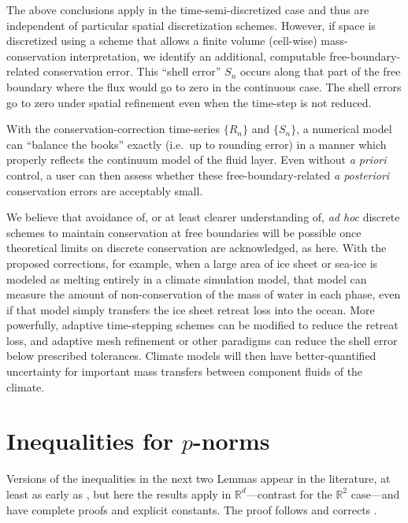 \documentclass[final,leqno,onefignum,onetabnum]{siamltex1213bueler}
\newcommand\RR{\mathbb{R}}
\begin{document}
The above conclusions apply in the time-semi-discretized case and thus are independent of particular spatial discretization schemes.  However, if space is discretized using a scheme that allows a finite volume (cell-wise) mass-conservation interpretation, we identify an additional, computable free-boundary-related conservation error.  This ``shell error'' $S_n$ occurs along that part of the free boundary where the flux would go to zero in the continuous case.  The shell errors go to zero under spatial refinement even when the time-step is not reduced.

With the conservation-correction time-series $\{R_n\}$ and $\{S_n\}$, a numerical model can ``balance the books'' exactly (i.e.~up to rounding error) in a manner which properly reflects the continuum model of the fluid layer.  Even without \emph{a priori} control, a user can then assess whether these free-boundary-related \emph{a posteriori} conservation errors are acceptably small.

We believe that avoidance of, or at least clearer understanding of, \emph{ad hoc} discrete schemes to maintain conservation at free boundaries will be possible once theoretical limits on discrete conservation are acknowledged, as here.  With the proposed corrections, for example, when a large area of ice sheet or sea-ice is modeled as melting entirely in a climate simulation model, that model can measure the amount of non-conservation of the mass of water in each phase, even if that model simply transfers the ice sheet retreat loss into the ocean.  More powerfully, adaptive time-stepping schemes can be modified to reduce the retreat loss, and adaptive mesh refinement or other paradigms can reduce the shell error below prescribed tolerances.  Climate models will then have better-quantified uncertainty for important mass transfers between component fluids of the climate.







\appendix

\section{Inequalities for $p$-norms}   \label{app:pinequalities}  Versions of the inequalities in the next two Lemmas appear in the literature, at least as early as \cite{GlowinskiMarroco1975}, but here the results apply in $\RR^d$---contrast \cite{BarrettLiu1993,GlowinskiMarroco1975} for the $\RR^2$ case---and have complete proofs and explicit constants.  The proof follows and corrects \cite[Appendix A]{Peral1997}.
\end{document}
